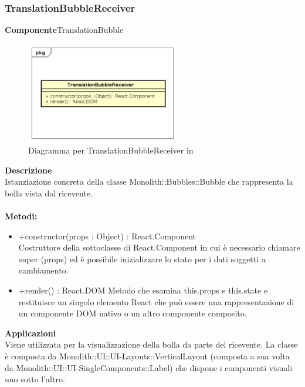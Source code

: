 \clearpage

\subsubsection{TranslationBubbleReceiver}
\textbf{Componente}TranslationBubble\\
   \FloatBarrier
   \begin{figure}[ht]
   \centering
   \includegraphics[width=0.6\textwidth]{img/single-TranslationBubbleReceiver}
   \caption{{Diagramma per TranslationBubbleReceiver in }}
\end{figure}
\FloatBarrier
\textbf{Descrizione}\\
Istanziazione concreta della classe Monolith::Bubbles::Bubble che rappresenta la bolla vista dal ricevente.
\\
\\
\textbf{Metodi:} 
\begin{itemize}
\item +constructor(props : Object) : React.Component 
\\
Costruttore della sottoclasse di React.Component in cui è necessario chiamare super (props) ed è possibile inizializzare lo stato per i dati soggetti a cambiamento.

\item +render() : React.DOM
Metodo che esamina this.props e this.state e restituisce un singolo elemento React che può essere una rappresentazione di un componente DOM nativo o un altro componente composito.

\end{itemize} 


\textbf{Applicazioni}\\
Viene utilizzata per la visualizzazione della bolla da parte del ricevente.
La classe è composta da Monolith::UI::UI-Layouts::VerticalLayout (composta a sua volta da Monolith::UI::UI-SingleComponents::Label) che dispone i componenti visuali uno sotto l'altro. 


\clearpage


